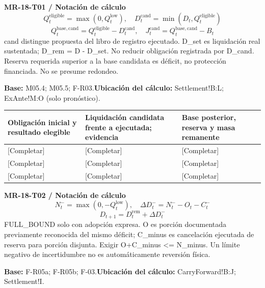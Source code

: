 \par\begingroup\sffamily\fontsize{8.4}{10.5}\selectfont\color{NEBGreen}
\textbf{MR-18-T01 / Notación de cálculo}\
{\fontsize{10}{12}\selectfont\[Q_t^{\mathrm{eligible}}=\max(0,Q_t^{\mathrm{low}}),\quad D_t^{\mathrm{cand}}=\min(D_t,Q_t^{\mathrm{eligible}})\]}
{\fontsize{10}{12}\selectfont\[Q_t^{\mathrm{base,cand}}=Q_t^{\mathrm{eligible}}-D_t^{\mathrm{cand}},\quad J_t^{\mathrm{cand}}=Q_t^{\mathrm{base,cand}}-B_t\]}
cand distingue propuesta del libro de registro ejecutado. D\_set es liquidación real sustentada; D\_rem = D - D\_set. No reducir obligación registrada por D\_cand. Reserva requerida superior a la base candidata es déficit, no protección financiada. No se presume redondeo.\par
\textbf{Base:} M05.4; M05.5; F-R03.\quad\textbf{Ubicación del cálculo:} Settlement!B:L; ExAnte!M:O (solo pronóstico).\par\endgroup
{\sffamily\fontsize{8.6}{10.7}\selectfont\begin{longtable}{@{}P{48mm}P{61mm}P{53mm}@{}}
\toprule
\textbf{Obligación inicial y resultado elegible} & \textbf{Liquidación candidata frente a ejecutada; evidencia} & \textbf{Base posterior, reserva y masa remanente}\\\midrule\endhead
\rule{0pt}{8mm}[Completar] & [Completar] & [Completar]\\\hline
\rule{0pt}{8mm}[Completar] & [Completar] & [Completar]\\\hline
\rule{0pt}{8mm}[Completar] & [Completar] & [Completar]\\\hline
\end{longtable}}
\par\begingroup\sffamily\fontsize{8.4}{10.5}\selectfont\color{NEBGreen}
\textbf{MR-18-T02 / Notación de cálculo}\
{\fontsize{10}{12}\selectfont\[N_t^-=\max(0,-Q_t^{\mathrm{low}}),\quad \Delta D_t^-=N_t^- -O_t-C_t^-\]}
{\fontsize{10}{12}\selectfont\[D_{t+1}=D_t^{\mathrm{rem}}+\Delta D_t^-\]}
FULL\_BOUND solo con adopción expresa. O es porción documentada previamente reconocida del mismo déficit; C\_minus es cancelación ejecutada de reserva para porción disjunta. Exigir O+C\_minus <= N\_minus. Un límite negativo de incertidumbre no es automáticamente reversión física.\par
\textbf{Base:} F-R05a; F-R05b; F-03.\quad\textbf{Ubicación del cálculo:} CarryForward!B:J; Settlement!I.\par\endgroup
